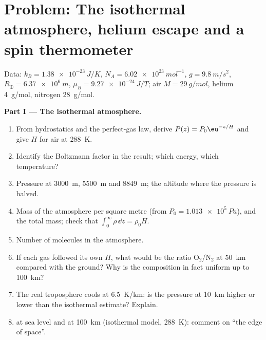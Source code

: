 \section{Problem: The isothermal atmosphere, helium escape and a spin thermometer}

\begin{problem}\label{pb:b2:boltzmann-factor:1}
Data: $k_B = \qty{1.38e-23}{J/K}$, $N_A = \qty{6.02e23}{mol^{-1}}$, $g =
\qty{9.8}{m/s^2}$, $R_{\oplus} = \qty{6.37e6}{m}$, $\mu_B = \qty{9.27e-24}{J/T}$;
air $M = \qty{29}{g/mol}$, helium \qty{4}{g/mol}, nitrogen \qty{28}{g/mol}.

\textbf{Part I --- The isothermal atmosphere.}
\begin{enumerate}
  \item From hydrostatics and the perfect-gas law, derive $P(z) =
        P_0\eu^{-z/H}$ and give $H$ for air at \qty{288}{K}.
  \item Identify the Boltzmann factor in the result; which energy,
        which temperature?
  \item Pressure at \qty{3000}{m}, \qty{5500}{m} and \qty{8849}{m}; the
        altitude where the pressure is halved.
  \item Mass of the atmosphere per square metre (from $P_0 =
        \qty{1.013e5}{Pa}$), and the total mass; check that $\int_0^\infty
        \rho\,\dd z = \rho_0H$.
  \item Number of molecules in the atmosphere.
  \item If each gas followed its own $H$, what would be the ratio
        O$_2$/N$_2$ at \qty{50}{km} compared with the ground? Why is the
        composition in fact uniform up to \qty{100}{km}?
  \item The real troposphere cools at \qty{6.5}{K/km}: is the pressure
        at \qty{10}{km} higher or lower than the isothermal estimate?
        Explain.
  \item {} at sea level and at \qty{100}{km} (isothermal
        model, \qty{288}{K}): comment on ``the edge of space''.
\end{enumerate}


\end{problem}
